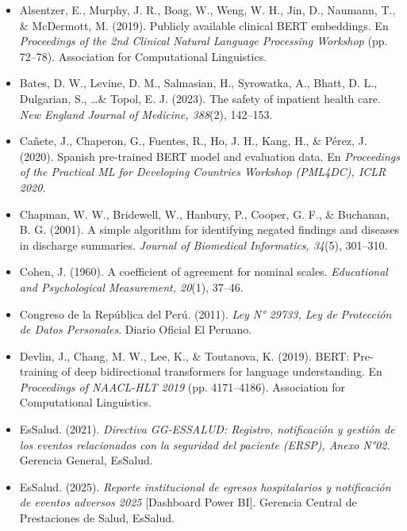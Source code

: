 \documentclass[12pt,a4paper,oneside]{book}
\begin{document}
\begin{itemize}[leftmargin=0pt,itemindent=0pt,itemsep=6pt,label={}]

\item Alsentzer, E., Murphy, J. R., Boag, W., Weng, W. H., Jin, D., Naumann, T., \& McDermott, M. (2019). Publicly available clinical BERT embeddings. En \textit{Proceedings of the 2nd Clinical Natural Language Processing Workshop} (pp. 72--78). Association for Computational Linguistics.

\item Bates, D. W., Levine, D. M., Salmasian, H., Syrowatka, A., Bhatt, D. L., Dulgarian, S., \ldots \& Topol, E. J. (2023). The safety of inpatient health care. \textit{New England Journal of Medicine, 388}(2), 142--153.

\item Cañete, J., Chaperon, G., Fuentes, R., Ho, J. H., Kang, H., \& Pérez, J. (2020). Spanish pre-trained BERT model and evaluation data. En \textit{Proceedings of the Practical ML for Developing Countries Workshop (PML4DC), ICLR 2020}.

\item Chapman, W. W., Bridewell, W., Hanbury, P., Cooper, G. F., \& Buchanan, B. G. (2001). A simple algorithm for identifying negated findings and diseases in discharge summaries. \textit{Journal of Biomedical Informatics, 34}(5), 301--310.

\item Cohen, J. (1960). A coefficient of agreement for nominal scales. \textit{Educational and Psychological Measurement, 20}(1), 37--46.

\item Congreso de la República del Perú. (2011). \textit{Ley N° 29733, Ley de Protección de Datos Personales}. Diario Oficial El Peruano.

\item Devlin, J., Chang, M. W., Lee, K., \& Toutanova, K. (2019). BERT: Pre-training of deep bidirectional transformers for language understanding. En \textit{Proceedings of NAACL-HLT 2019} (pp. 4171--4186). Association for Computational Linguistics.

\item EsSalud. (2021). \textit{Directiva GG-ESSALUD: Registro, notificación y gestión de los eventos relacionados con la seguridad del paciente (ERSP), Anexo N°02}. Gerencia General, EsSalud.

\item EsSalud. (2025). \textit{Reporte institucional de egresos hospitalarios y notificación de eventos adversos 2025} [Dashboard Power BI]. Gerencia Central de Prestaciones de Salud, EsSalud.


\end{itemize}
\end{document}
